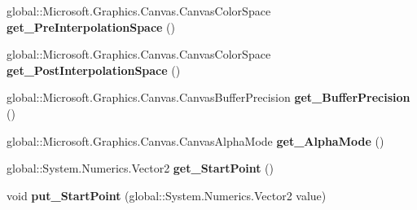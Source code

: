 \begin{DoxyCompactItemize}
\item 
\mbox{\label{interface_microsoft_1_1_graphics_1_1_canvas_1_1_brushes_1_1_i_canvas_linear_gradient_brush_a4fae3e034b5a7682ce6f36b1b53ca7f2}} 
global\+::\+Microsoft.\+Graphics.\+Canvas.\+Canvas\+Color\+Space {\bfseries get\+\_\+\+Pre\+Interpolation\+Space} ()
\item 
\mbox{\label{interface_microsoft_1_1_graphics_1_1_canvas_1_1_brushes_1_1_i_canvas_linear_gradient_brush_af17f5053ad253aed98e1a18bd5e60b8f}} 
global\+::\+Microsoft.\+Graphics.\+Canvas.\+Canvas\+Color\+Space {\bfseries get\+\_\+\+Post\+Interpolation\+Space} ()
\item 
\mbox{\label{interface_microsoft_1_1_graphics_1_1_canvas_1_1_brushes_1_1_i_canvas_linear_gradient_brush_a5b2b98092e712966b733302d129af2bc}} 
global\+::\+Microsoft.\+Graphics.\+Canvas.\+Canvas\+Buffer\+Precision {\bfseries get\+\_\+\+Buffer\+Precision} ()
\item 
\mbox{\label{interface_microsoft_1_1_graphics_1_1_canvas_1_1_brushes_1_1_i_canvas_linear_gradient_brush_a532e44644b9768234226a878bed13561}} 
global\+::\+Microsoft.\+Graphics.\+Canvas.\+Canvas\+Alpha\+Mode {\bfseries get\+\_\+\+Alpha\+Mode} ()
\item 
\mbox{\label{interface_microsoft_1_1_graphics_1_1_canvas_1_1_brushes_1_1_i_canvas_linear_gradient_brush_a4c95714cff8fe9867956a7f25cd99030}} 
global\+::\+System.\+Numerics.\+Vector2 {\bfseries get\+\_\+\+Start\+Point} ()
\item 
\mbox{\label{interface_microsoft_1_1_graphics_1_1_canvas_1_1_brushes_1_1_i_canvas_linear_gradient_brush_a4fde9ab6feb18000a3354b8af87b6090}} 
void {\bfseries put\+\_\+\+Start\+Point} (global\+::\+System.\+Numerics.\+Vector2 value)
\item 

\end{DoxyCompactItemize}
